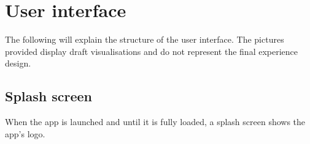 \section{User interface}

The following will explain the structure of the user interface. The pictures provided display draft visualisations and do not represent the final experience design.

\subsection{Splash screen}

\begin{minipage}{0.45\textwidth}
When the app is launched and until it is fully loaded, a splash screen shows the app's logo.
\end{minipage} \hfill
\begin{minipage}{0.5\textwidth}
\end{minipage}

